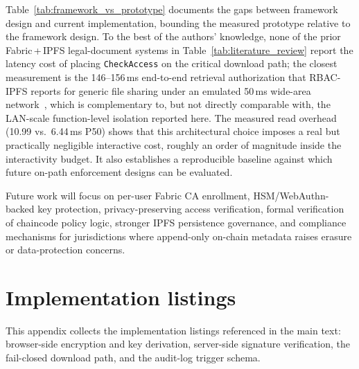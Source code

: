 \documentclass[preprint,12pt]{elsarticle}
\begin{document}
Table~\ref{tab:framework_vs_prototype} documents the gaps between framework
design and current implementation, bounding the measured prototype relative
to the framework design. To the best of the authors' knowledge, none of the
prior Fabric\,+\,IPFS legal-document systems in Table~\ref{tab:literature_review}
report the latency cost of placing \texttt{CheckAccess} on the critical
download path; the closest measurement is the 146--156\,ms end-to-end
retrieval authorization that RBAC-IPFS reports for generic file sharing
under an emulated 50\,ms wide-area network~\cite{liu2026rbacipfs}, which
is complementary to, but not directly comparable with, the LAN-scale
function-level isolation reported here. The measured read overhead
(10.99 vs.\ 6.44\,ms P50) shows that this architectural choice imposes a
real but practically negligible interactive cost, roughly an order of
magnitude inside the interactivity budget. It also establishes a reproducible baseline
against which future on-path enforcement designs can be evaluated.

Future work will focus on per-user Fabric CA enrollment, HSM/WebAuthn-backed
key protection, privacy-preserving access verification, formal verification
of chaincode policy logic, stronger IPFS persistence governance, and
compliance mechanisms for jurisdictions where append-only on-chain metadata
raises erasure or data-protection concerns.


\appendix
\section{Implementation listings}
\label{app:listings}

This appendix collects the implementation listings referenced in the main
text: browser-side encryption and key derivation, server-side signature
verification, the fail-closed download path, and the audit-log trigger
schema.
\end{document}
